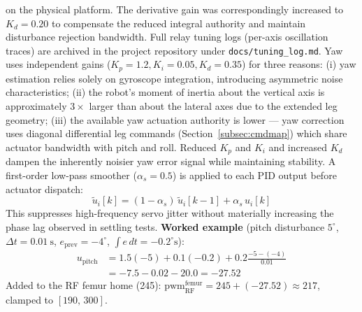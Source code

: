 \documentclass[journal]{IEEEtran}
\newcommand{\dg}{^{\circ}}
\begin{document}
on the physical platform.
The derivative gain was correspondingly increased to $K_d = 0.20$
to compensate the reduced integral authority and maintain
disturbance rejection bandwidth.
Full relay tuning logs (per-axis oscillation traces) are archived
in the project repository under \texttt{docs/tuning\_log.md}.
Yaw uses independent gains ($K_p=1.2, K_i=0.05, K_d=0.35$) for
three reasons:
(i) yaw estimation relies solely on gyroscope integration,
introducing asymmetric noise characteristics;
(ii) the robot's moment of inertia about the vertical axis is
approximately $3\times$ larger than about the lateral axes
due to the extended leg geometry;
(iii) the available yaw actuation authority is lower ---
yaw correction uses diagonal differential leg commands
(Section~\ref{subsec:cmdmap}) which share actuator bandwidth
with pitch and roll.
Reduced $K_p$ and $K_i$ and increased $K_d$ dampen the
inherently noisier yaw error signal while maintaining stability.
A first-order low-pass smoother ($\alpha_s = 0.5$) is applied
to each PID output before actuator dispatch:
\begin{equation}
\tilde{u}_i[k] = (1-\alpha_s)\,\tilde{u}_i[k-1] + \alpha_s\,u_i[k]
\label{eq:smooth}
\end{equation}
This suppresses high-frequency servo jitter without materially
increasing the phase lag observed in settling tests.
\noindent\textbf{Worked example} (pitch disturbance $5\dg$,
$\Delta t = \SI{0.01}{\second}$, $e_\text{prev} = -4\dg$,
$\int e\,dt = -0.2\dg\text{s}$):
\begin{align*}
u_\text{pitch} &= 1.5(-5) + 0.1(-0.2) + 0.2\tfrac{-5-(-4)}{0.01} \\
               &= -7.5 - 0.02 - 20.0 = -27.52
\end{align*}
Added to the RF femur home (245):
$\text{pwm}_\text{RF}^\text{femur} = 245 + (-27.52) \approx 217$,
clamped to $[190,\,300]$.
\end{document}
